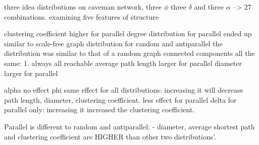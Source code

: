 three idea distributions on caveman network, three $\phi$ three $\delta$ and three $\alpha$ --> 27 combinations. examining five features of structure

clustering coefficient
	higher for parallel
degree distribution
	for parallel ended up similar to scale-free graph distribution
	for random and antiparallel the distribution was similar to that of a random graph
connected components
	all the same: 1. always all reachable
average path length
	larger for parallel
diameter
	larger for parallel


alpha
	no effect
phi
	same effect for all distributions: increasing it will decrease path length, diameter, clustering coefficient. less effect for parallel
delta
	for parallel only: increasing it increased the clustering coefficient.

Parallel is different to random and antiparallel: 
- diameter, average shortest path and clustering coefficient are HIGHER than other two distributions'.
